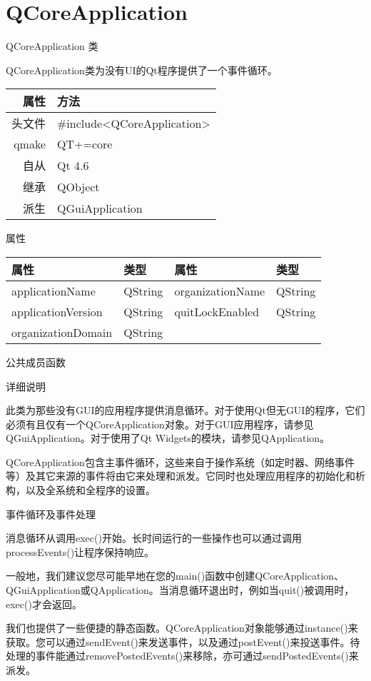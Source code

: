 \chapter{QCoreApplication}

QCoreApplication 类

QCoreApplication类为没有UI的Qt程序提供了一个事件循环。

\begin{tabular}{|r|l|}
\hline
属性&	方法\\
\hline
头文件&	\#include<QCoreApplication>\\
\hline
qmake&	QT+=core\\
\hline
自从&	Qt 4.6\\
\hline
继承&	QObject\\
\hline
派生&	QGuiApplication\\
\hline
\end{tabular}

属性

\begin{tabular}{|l|l|l|l|}
\hline
属性&	类型&	属性&	类型\\
\hline
applicationName&	QString&	organizationName&	QString\\
\hline
applicationVersion&	QString&	quitLockEnabled	&QString\\
\hline
organizationDomain&	QString&		&\\
\hline
\end{tabular}

\splitLine

公共成员函数

详细说明

此类为那些没有GUI的应用程序提供消息循环。对于使用Qt但无GUI的程序，它们必须有且仅有一个QCoreApplication对象。对于GUI应用程序，请参见QGuiApplication。对于使用了Qt Widgets的模块，请参见QApplication。

QCoreApplication包含主事件循环，这些来自于操作系统（如定时器、网络事件等）及其它来源的事件将由它来处理和派发。它同时也处理应用程序的初始化和析构，以及全系统和全程序的设置。

事件循环及事件处理

消息循环从调用exec()开始。长时间运行的一些操作也可以通过调用processEvents()让程序保持响应。

一般地，我们建议您尽可能早地在您的main()函数中创建QCoreApplication、QGuiApplication或QApplication。当消息循环退出时，例如当quit()被调用时，exec()才会返回。

我们也提供了一些便捷的静态函数。QCoreApplication对象能够通过instance()来获取。您可以通过sendEvent()来发送事件，以及通过postEvent()来投送事件。待处理的事件能通过removePostedEvents()来移除，亦可通过sendPostedEvents()来派发。

